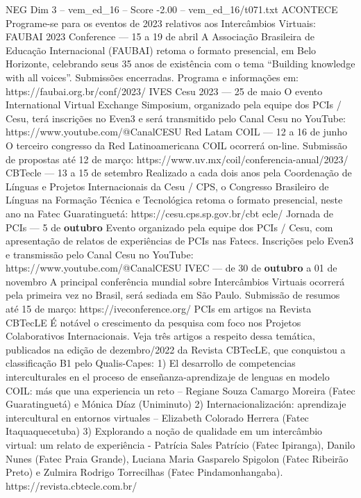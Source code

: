 \begin{textsample}{NEG Dim 3 – vem\_ed\_16 – Score -2.00 – vem\_ed\_16/t071.txt}  \label{ex:f3_neg_015}
ACONTECE Programe-se para os eventos de 2023 relativos aos Intercâmbios Virtuais: FAUBAI 2023 Conference — 15 a 19 de abril A Associação Brasileira de Educação Internacional (FAUBAI) retoma o formato presencial, em Belo Horizonte, celebrando seus 35 anos de existência com o tema “Building knowledge with all voices”.
Submissões encerradas.
Programa e informações em: https://faubai.org.br/conf/2023/ IVES Cesu 2023 — 25 de maio O evento International Virtual Exchange Simposium, organizado pela equipe dos PCIs / Cesu, terá inscrições no Even3 e será transmitido pelo Canal Cesu no YouTube: https://www.youtube.com/@CanalCESU Red Latam COIL — 12 a 16 de junho O terceiro congresso da Red Latinoamericana COIL ocorrerá on-line.
Submissão de propostas até 12 de março: https://www.uv.mx/coil/conferencia-anual/2023/ CBTecle — 13 a 15 de setembro Realizado a cada dois anos pela Coordenação de Línguas e Projetos Internacionais da Cesu / CPS, o Congresso Brasileiro de Línguas na Formação Técnica e Tecnológica retoma o formato presencial, neste ano na Fatec Guaratinguetá: https://cesu.cps.sp.gov.br/cbt ecle/ Jornada de PCIs — 5 de \textbf{outubro} Evento organizado pela equipe dos PCIs / Cesu, com apresentação de relatos de experiências de PCIs nas Fatecs.
Inscrições pelo Even3 e transmissão pelo Canal Cesu no YouTube: https://www.youtube.com/@CanalCESU IVEC — de 30 de \textbf{outubro} a 01 de novembro A principal conferência mundial sobre Intercâmbios Virtuais ocorrerá pela primeira vez no Brasil, será sediada em São Paulo.
Submissão de resumos até 15 de março: https://iveconference.org/ PCIs em artigos na Revista CBTecLE É notável o crescimento da pesquisa com foco nos Projetos Colaborativos Internacionais.
Veja três artigos a respeito dessa temática, publicados na edição de dezembro/2022 da Revista CBTecLE, que conquistou a classificação B1 pelo Qualis-Capes: 1) El desarrollo de competencias interculturales en el proceso de enseñanza-aprendizaje de lenguas en modelo COIL: más que una experiencia un reto – Regiane Souza Camargo Moreira (Fatec Guaratinguetá) e Mónica Díaz (Uniminuto) 2) Internacionalización: aprendizaje intercultural en entornos virtuales – Elizabeth Colorado Herrera (Fatec Itaquaquecetuba) 3) Explorando a noção de qualidade em um intercâmbio virtual: um relato de experiência - Patrícia Sales Patrício (Fatec Ipiranga), Danilo Nunes (Fatec Praia Grande), Luciana Maria Gasparelo Spigolon (Fatec Ribeirão Preto) e Zulmira Rodrigo Torrecilhas (Fatec Pindamonhangaba). https://revista.cbtecle.com.br/

\end{textsample}
